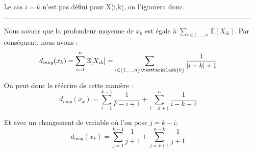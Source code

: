 \documentclass[a4paper,12pt]{report}
\begin{document}
\begin{tcolorbox}[colback=gray!10, colframe=blue!30, coltitle=black, title=Réponse à la 6.c - 1/3]
    Le cas \( i = k \) n'est pas défini pour X(i,k), on l'ignorera donc.

    \vspace{0.5cm}
    \hrule
    \vspace{0.5cm}

    Nous savons que la profondeur moyenne de \( x_k \) est égale à \(\sum_{i \in {1, \dots, n} \ } \mathbb{E}[X_{ik}]\). Par conséquent, nous avons :
    \[
    \ d_{moy}(x_k) = \sum_{i = 1}^{n} \mathbb{E}[X_{ik}] = \sum_{i \in \{1, \dots, n\} \textbackslash \{k\}} \frac{1}{|i - k| + 1}
    \]

    \vspace{0.5cm}

    On peut donc le réécrire de cette manière :
    \[
    \ d_{moy}(x_k) = \sum_{i = 1}^{k-1} \frac{1}{k - i + 1} + \sum_{i = k+1}^{n} \frac{1}{i - k + 1}
    \]

    \vspace{0.5cm}

    Et avec un changement de variable où l'on pose \( j = k - i \):
    \[
    \ d_{moy}(x_k) = \sum_{j = 1}^{k-1} \frac{1}{j + 1} + \sum_{j = k+1}^{n - k} \frac{1}{j + 1}
    \]

\end{tcolorbox}
\end{document}
